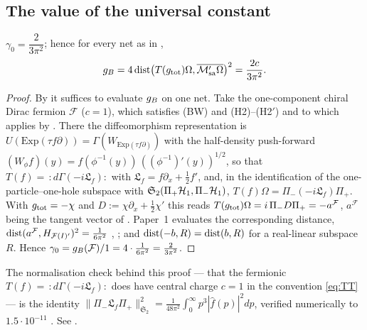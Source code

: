 \subsection{The value of the universal constant}\label{ss:value}

\begin{theorem}[value]\label{thm:value}
$\gamma_{0}=\dfrac{2}{3\pi^{2}}$; hence for every net as in ,
\begin{equation}\label{eq:value}
 g_{B}=4\operatorname{dist}\bigl(T(g_{\rm tot})\Omega,\overline{\mathcal M'_{\rm sa}\Omega}\bigr)^{2}=\frac{2c}{3\pi^{2}} .
\end{equation}
\end{theorem}

\begin{proof}
By  it suffices to evaluate $g_{B}$ on one net.  Take the one-component chiral Dirac fermion
$\mathcal F$ ($c=1$), which satisfies (BW) and (H2)--(H2$'$) and to which  applies by
.  There the diffeomorphism representation is $U(\mathrm{Exp}(\tau f\partial))
=\Gamma(W_{\mathrm{Exp}(\tau f\partial)})$ with the half-density push-forward
$(W_{\phi}f)(y)=f(\phi^{-1}(y))\,((\phi^{-1})'(y))^{1/2}$, so that
$T(f)=\,:\!d\Gamma(-i\mathfrak L_{f})\!:$ with $\mathfrak L_{f}=f\partial_{x}+\frac12f'$, and, in the
identification of the one-particle--one-hole subspace with $\mathfrak S_{2}(\Pi_{+}\mathcal H_{1},\Pi_{-}\mathcal H_{1})$,
$T(f)\Omega=\Pi_{-}(-i\mathfrak L_{f})\Pi_{+}$.  With $g_{\rm tot}=-\chi$ and $D:=\chi\partial_{x}
+\frac12\chi'$ this reads $T(g_{\rm tot})\Omega=i\,\Pi_{-}D\Pi_{+}=-a^{\mathcal F}$, $a^{\mathcal F}$ being
the tangent vector of \cite{RigorUB}.  Paper~1 evaluates the corresponding distance,
$\operatorname{dist}(a^{\mathcal F},H_{\mathcal F(I)'})^{2}=\frac{1}{6\pi^{2}}$ \cite[Prop.\ ``The infimum'']{RigorUB},
\cite{Paper1}; and $\operatorname{dist}(-b,R)=\operatorname{dist}(b,R)$ for a real-linear subspace $R$.  Hence
$\gamma_{0}=g_{B}(\mathcal F)/1=4\cdot\frac{1}{6\pi^{2}}=\frac{2}{3\pi^{2}}$.
\end{proof}

The normalisation check behind this proof --- that the fermionic $T(f)=\,:\!d\Gamma(-i\mathfrak L_{f})\!:$
does have central charge $c=1$ in the convention \eqref{eq:TT} --- is the identity
$\|\Pi_{-}\mathfrak L_{f}\Pi_{+}\|_{\mathfrak S_{2}}^{2}=\frac{1}{48\pi^{2}}\int_{0}^{\infty}
p^{3}|\hat f(p)|^{2}dp$, verified numerically to $1.5\cdot10^{-11}$ \cite{RigorB}.  See .

